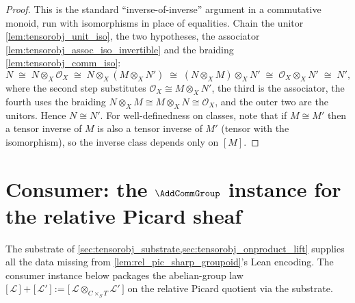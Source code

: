 \begin{proof}
  \leanok
  This is the standard ``inverse-of-inverse'' argument in a commutative monoid, run
  with isomorphisms in place of equalities. Chain the unitor
  \cref{lem:tensorobj_unit_iso}, the two hypotheses, the associator
  \cref{lem:tensorobj_assoc_iso_invertible} and the braiding
  \cref{lem:tensorobj_comm_iso}:
  \[
    N
    \;\cong\; N \otimes_X \mathcal{O}_X
    \;\cong\; N \otimes_X (M \otimes_X N')
    \;\cong\; (N \otimes_X M) \otimes_X N'
    \;\cong\; \mathcal{O}_X \otimes_X N'
    \;\cong\; N',
  \]
  where the second step substitutes \(\mathcal{O}_X \cong M \otimes_X N'\), the
  third is the associator, the fourth uses the braiding
  \(N \otimes_X M \cong M \otimes_X N \cong \mathcal{O}_X\), and the outer two are
  the unitors. Hence \(N \cong N'\). For well-definedness on classes, note that if
  \(M \cong M'\) then a tensor inverse of \(M\) is also a tensor inverse of \(M'\)
  (tensor with the isomorphism), so the inverse class depends only on \([M]\).
\end{proof}

\section{Consumer: the \(\AddCommGroup\) instance for the relative Picard sheaf}
\label{sec:tensorobj_consumer_acg}

The substrate of \cref{sec:tensorobj_substrate,sec:tensorobj_onproduct_lift}
supplies all the data missing from \cref{lem:rel_pic_sharp_groupoid}'s Lean
encoding. The consumer instance below packages the abelian-group law
\(\bigl[\,\mathcal{L}\,\bigr] + \bigl[\,\mathcal{L}'\,\bigr]
 := \bigl[\,\mathcal{L} \otimes_{C \times_S T} \mathcal{L}'\,\bigr]\) on the
relative Picard quotient via the substrate.

